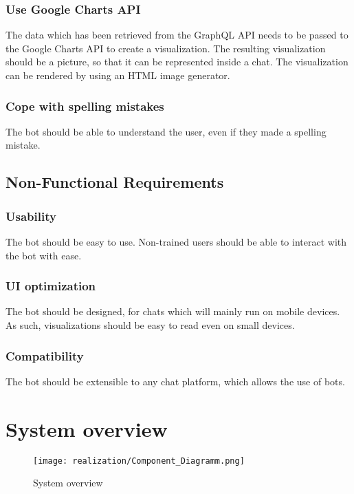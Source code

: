 \subsubsection{Use Google Charts API} The data which has been retrieved from the GraphQL API needs to be passed to the Google Charts API to create a visualization. The resulting visualization should be a picture, so that it can be represented inside a chat. The visualization can be rendered by using an HTML image generator.

\subsubsection{Cope with spelling mistakes} The bot should be able to understand the user, even if they made a spelling mistake.

\subsection{Non-Functional Requirements}

\subsubsection{Usability} The bot should be easy to use. Non-trained users should be able to interact with the bot with ease.

\subsubsection{UI optimization} The bot should be designed, for chats which will mainly run on mobile devices. As such, visualizations should be easy to read even on small devices.

\subsubsection{Compatibility} The bot should be extensible to any chat platform, which allows the use of bots.

\section{System overview}


\begin{figure}[h]
    \centering
    \texttt{[image: realization/Component\_Diagramm.png]}
    \caption{System overview}
    \label{fig:sytsemOverview}
\end{figure}

